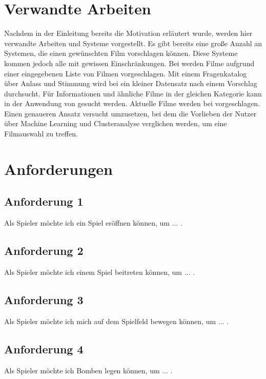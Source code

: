 \documentclass[conference]{IEEEtran}
\begin{document}
\section{Verwandte Arbeiten}

Nachdem in der Einleitung bereits die Motivation erläutert wurde, werden hier verwandte Arbeiten und Systeme vorgestellt.
Es gibt bereits eine große Anzahl an Systemen, die einen gewünschten Film vorschlagen können. Diese Systeme kommen jedoch alle mit gewissen Einschränkungen.
Bei \cite{cinemate} werden Filme aufgrund einer eingegebenen Liste von Filmen vorgeschlagen.
Mit einem Fragenkatalog über Anlass und Stimmung wird bei \cite{pickamovieforme} ein kleiner Datensatz nach einem Vorschlag durchsucht.
Für Informationen und ähnliche Filme in der gleichen Kategorie kann in der Anwendung von \cite{bestsimilar} gesucht werden.
Aktuelle Filme werden bei \cite{tastedive} vorgeschlagen.
Einen genaueren Ansatz versucht \cite{MovieGEN} umzusetzen, bei dem die Vorlieben der Nutzer über Machine Learning und Clusteranalyse verglichen werden, um eine Filmauswahl zu treffen.

\section{Anforderungen}

\subsection{Anforderung 1}
\label{1}
Als Spieler möchte ich ein Spiel eröffnen können, um ... .


\subsection{Anforderung 2}
\label{2}
Als Spieler möchte ich einem Spiel beitreten können, um ... .

\subsection{Anforderung 3}

Als Spieler möchte ich mich auf dem Spielfeld bewegen können, um ... .

\subsection{Anforderung 4}

Als Spieler möchte ich Bomben legen können, um ... .
\end{document}
